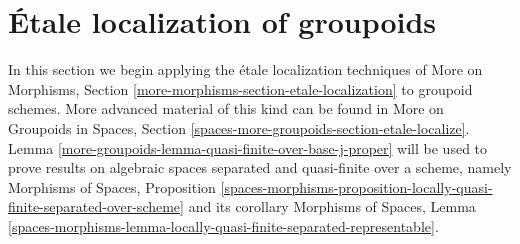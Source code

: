 \section{\'Etale localization of groupoids}
\label{more-groupoids-section-etale-localize}
In this section we begin applying the \'etale localization techniques of
More on Morphisms, Section \ref{more-morphisms-section-etale-localization}
to groupoid schemes. More advanced material of this kind can be found in
More on Groupoids in Spaces,
Section \ref{spaces-more-groupoids-section-etale-localize}.
Lemma \ref{more-groupoids-lemma-quasi-finite-over-base-j-proper}
will be used to prove results on algebraic spaces
separated and quasi-finite over a scheme, namely
Morphisms of Spaces, Proposition
\ref{spaces-morphisms-proposition-locally-quasi-finite-separated-over-scheme}
and its corollary
Morphisms of Spaces, Lemma
\ref{spaces-morphisms-lemma-locally-quasi-finite-separated-representable}.

